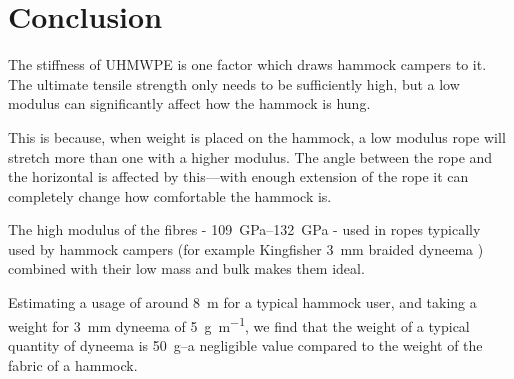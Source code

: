 \section{Conclusion}
The stiffness of UHMWPE is one factor which draws hammock campers to it. The ultimate tensile strength only needs to be sufficiently high, but a low modulus can significantly affect how the hammock is hung.

This is because, when weight is placed on the hammock, a low modulus rope will stretch more than one with a higher modulus. The angle between the rope and the horizontal is affected by this---with enough extension of the rope it can completely change how comfortable the hammock is.

The high modulus of the fibres - \SIrange{109}{132}{\giga\pascal}  - used in ropes typically used by hammock campers (for example Kingfisher \SI{3}{\milli\metre} braided dyneema ) combined with their low mass and bulk makes them ideal.

Estimating a usage of around \SI{8}{\metre} for a typical hammock user, and taking a weight for \SI{3}{\milli\metre} dyneema of \SI{5}{\gram\per\metre}, we find that the weight of a typical quantity of dyneema is \SI{50}{\gram}--a negligible value compared to the weight of the fabric of a hammock.
